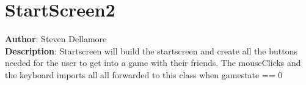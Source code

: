 \documentclass[12pt]{article}
\begin{document}
\section{StartScreen2}
\textbf{Author}: Steven Dellamore \\
\textbf{Description}: Startscreen will build the startscreen and create all the buttons needed for the user to get into a game with their friends. The mouseClicks and the keyboard imports all all forwarded to this class when gamestate == 0 \\
\end{document}
